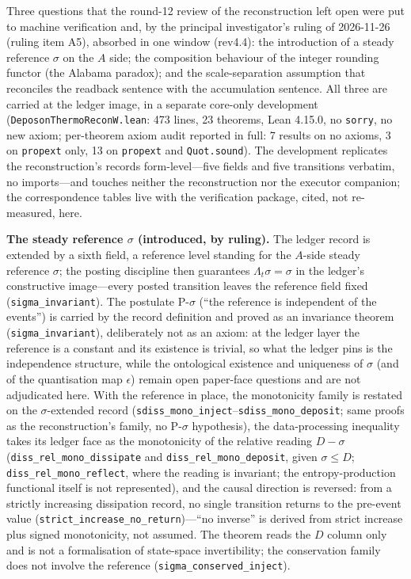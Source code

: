 \documentclass[11pt,a4paper]{article}
\newcommand{\thm}[1]{\nolinkurl{#1}}
\begin{document}
Three questions that the round-12 review of the reconstruction left open were put to machine verification and, by the principal investigator's ruling of 2026-11-26 (ruling item A5), absorbed in one window (rev4.4): the introduction of a steady reference $\sigma$ on the $A$ side; the composition behaviour of the integer rounding functor (the Alabama paradox); and the scale-separation assumption that reconciles the readback sentence with the accumulation sentence. All three are carried at the ledger image, in a separate core-only development (\texttt{DeposonThermoReconW.lean}: 473 lines, 23 theorems, Lean 4.15.0, no \texttt{sorry}, no new axiom; per-theorem axiom audit reported in full: 7 results on no axioms, 3 on \texttt{propext} only, 13 on \texttt{propext} and \texttt{Quot.sound}). The development replicates the reconstruction's records form-level---five fields and five transitions verbatim, no imports---and touches neither the reconstruction nor the executor companion; the correspondence tables live with the verification package, cited, not re-measured, here.

\textbf{The steady reference $\sigma$ (introduced, by ruling).} The ledger record is extended by a sixth field, a reference level standing for the $A$-side steady reference $\sigma$; the posting discipline then guarantees $\Lambda_t\sigma=\sigma$ in the ledger's constructive image---every posted transition leaves the reference field fixed (\thm{sigma_invariant}). The postulate P-$\sigma$ (``the reference is independent of the events'') is carried by the record definition and proved as an invariance theorem (\thm{sigma_invariant}), deliberately not as an axiom: at the ledger layer the reference is a constant and its existence is trivial, so what the ledger pins is the independence structure, while the ontological existence and uniqueness of $\sigma$ (and of the quantisation map $\epsilon$) remain open paper-face questions and are not adjudicated here. With the reference in place, the monotonicity family is restated on the $\sigma$-extended record (\thm{sdiss_mono_inject}--\thm{sdiss_mono_deposit}; same proofs as the reconstruction's family, no P-$\sigma$ hypothesis), the data-processing inequality takes its ledger face as the monotonicity of the relative reading $D-\sigma$ (\thm{diss_rel_mono_dissipate} and \thm{diss_rel_mono_deposit}, given $\sigma \le D$; \thm{diss_rel_mono_reflect}, where the reading is invariant; the entropy-production functional itself is not represented), and the causal direction is reversed: from a strictly increasing dissipation record, no single transition returns to the pre-event value (\thm{strict_increase_no_return})---``no inverse'' is derived from strict increase plus signed monotonicity, not assumed. The theorem reads the $D$ column only and is not a formalisation of state-space invertibility; the conservation family does not involve the reference (\thm{sigma_conserved_inject}).
\end{document}
